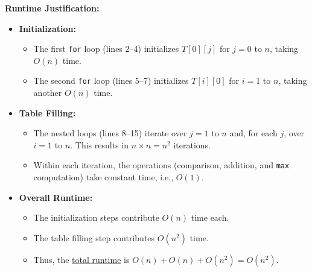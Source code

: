 \documentclass[11pt]{article}
\begin{document}
        \textbf{Runtime Justification:}
        \begin{itemize}
            \item \textbf{Initialization:} 
            \begin{itemize}
                \item The first \texttt{for} loop (lines 2--4) initializes $T[0][j]$ for $j = 0$ to $n$, taking $O(n)$ time.
                \item The second \texttt{for} loop (lines 5--7) initializes $T[i][0]$ for $i = 1$ to $n$, taking another $O(n)$ time.
            \end{itemize}
            \item \textbf{Table Filling:} 
            \begin{itemize}
                \item The nested loops (lines 8--15) iterate over $j = 1$ to $n$ and, for each $j$, over $i = 1$ to $n$. This results in $n \times n = n^2$ iterations.
                \item Within each iteration, the operations (comparison, addition, and \texttt{max} computation) take constant time, i.e., $O(1)$.
            \end{itemize}
            \item \textbf{Overall Runtime:} 
            \begin{itemize}
                \item The initialization steps contribute $O(n)$ time each.
                \item The table filling step contributes $O(n^2)$ time.
                \item Thus, the \underline{total runtime} is $O(n) + O(n) + O(n^2) = O(n^2)$.
            \end{itemize}
        \end{itemize}
    \newpage
\end{document}
